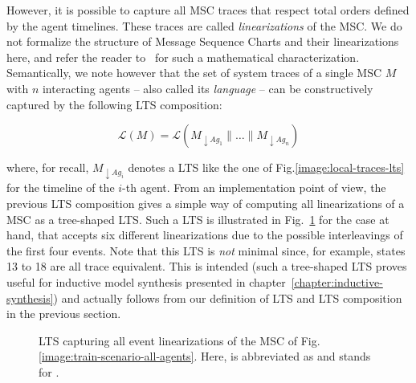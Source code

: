 However, it is possible to capture all MSC traces that respect total orders defined by the agent timelines. These traces are called \emph{linearizations} of the MSC. We do not formalize the structure of Message Sequence Charts and their linearizations here, and refer the reader to~\cite{Uchitel:2003} for such a mathematical characterization. Semantically, we note however that the set of system traces of a single MSC $M$ with $n$ interacting agents -- also called its \emph{language} -- can be constructively captured by the following LTS composition:

\begin{equation}
\label{equation:msc-composition}
\mathcal{L}(M) = \mathcal{L}(M_{\downarrow Ag_1} \parallel \ldots \parallel M_{\downarrow Ag_n})
\end{equation}

\noindent where, for recall, $M_{\downarrow Ag_i}$ denotes a LTS like the one of Fig.\ref{image:local-traces-lts} for the timeline of the $i$-th agent. From an implementation point of view, the previous LTS composition gives a simple way of computing all linearizations of a MSC as a tree-shaped LTS. Such a LTS is illustrated in Fig.~\ref{image:msc-linearizations} for the case at hand, that accepts six different linearizations due to the possible interleavings of the first four events. Note that this LTS is \emph{not} minimal since, for example, states 13 to 18 are all trace equivalent. This is intended (such a tree-shaped LTS proves useful for inductive model synthesis presented in chapter~\ref{chapter:inductive-synthesis}) and actually follows from our definition of LTS and LTS composition in the previous section.

\vspace{0.5cm}
\begin{figure}[H]\centering
{}
\caption{LTS capturing all event linearizations of the MSC of Fig.\ref{image:train-scenario-all-agents}. Here,  is abbreviated as  and  stands for . \label{image:msc-linearizations}}
\end{figure}

